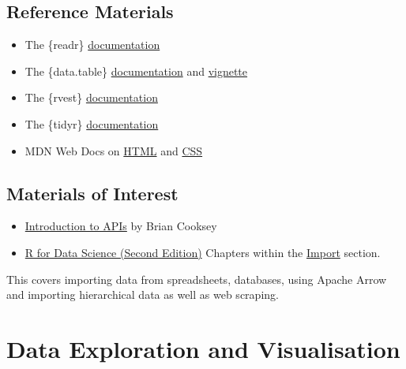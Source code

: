 \documentclass[
  12pt,
]{book}
\providecommand{\tightlist}{%
  \setlength{\itemsep}{0pt}\setlength{\parskip}{0pt}}
\begin{document}
\hypertarget{reference-materials-1}{%
\subsection*{Reference Materials}\label{reference-materials-1}}

\begin{itemize}
\item
  The \{readr\} \href{https://readr.tidyverse.org/}{documentation}
\item
  The \{data.table\} \href{https://cran.r-project.org/web/packages/data.table/data.table.pdf}{documentation} and \href{https://cran.r-project.org/web/packages/data.table/vignettes/datatable-intro.html}{vignette}
\item
  The \{rvest\} \href{https://rvest.tidyverse.org/}{documentation}
\item
  The \{tidyr\} \href{https://tidyr.tidyverse.org/}{documentation}
\item
  MDN Web Docs on \href{https://developer.mozilla.org/en-US/docs/Web/HTML}{HTML} and \href{https://developer.mozilla.org/en-US/docs/Web/CSS}{CSS}
\end{itemize}

\hypertarget{materials-of-interest-1}{%
\subsection*{Materials of Interest}\label{materials-of-interest-1}}

\begin{itemize}
\tightlist
\item
  \href{https://zapier.com/learn/apis/chapter-1-introduction-to-apis/}{Introduction to APIs} by Brian Cooksey
\item
  \href{https://r4ds.hadley.nz/}{R for Data Science (Second Edition)} Chapters within the \href{https://r4ds.hadley.nz/import.html}{Import} section.
\end{itemize}

This covers importing data from spreadsheets, databases, using Apache Arrow and importing hierarchical data as well as web scraping.

\hypertarget{edav-reading}{%
\section{Data Exploration and Visualisation}\label{edav-reading}}
\end{document}
